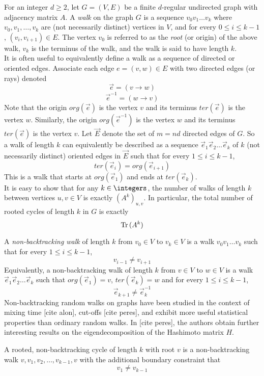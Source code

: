 \begin{description}
For an integer $d \geq 2$, let $G=(V,E)$ be a finite $d$-regular undirected graph with adjacency matrix $A$. A \emph{walk} on the graph $G$ is a sequence $v_0v_1\dots v_{k}$ where $v_0,v_1,\dots,v_k$ are (not necessarily distinct) vertices in $V$, and for every $0 \leq i \leq k-1$, $(v_i,v_{i+1}) \in E$. The vertex $v_0$ is referred to as the \emph{root} (or origin) of the above walk, $v_k$ is the terminus of the walk, and the walk is said to have length $k$.\\
It is often useful to equivalently define a walk as a sequence of directed or oriented edges. Associate each edge $e=(v,w) \in E$ with two directed edges (or rays) denoted
$$\vec{e}=(v \to w)$$
$$\vec{e}^{-1} = (w \to v)$$
Note that the origin $org(\vec{e})$ is the vertex $v$ and its terminus $ter(\vec{e})$ is the vertex $w$. Similarly, the origin $org(\vec{e}^{-1})$ is the vertex $w$ and its terminus $ter(\vec{e})$ is the vertex $v$. Let $\vec{E}$ denote the set of $m=nd$ directed edges of $G$. So a walk of length $k$ can equivalently be described as a sequence $\vec{e}_1\vec{e}_2\dots\vec{e}_k$ of $k$ (not necessarily distinct) oriented edges in $\vec{E}$ such that for every $1 \leq i \leq k-1$,
$$ter(\vec{e}_i) = org(\vec{e}_{i+1})$$
This is a walk that starts at $org(\vec{e}_1)$ and ends at $ter(\vec{e}_k)$.\\
It is easy to show that for any $k \in \integers$, the number of walks of length $k$ between vertices $u,v \in V$ is exactly $(A^k)_{u,v}$. In particular, the total number of rooted cycles of length $k$ in $G$ is exactly
$$\mbox{\rm Tr}\,(A^k)$$


A \emph{non-backtracking walk} of length $k$ from $v_0 \in V$ to $v_k \in
V$ is a walk $v_0v_1\dots v_k$ such that for every $1 \leq i \leq k-1$,
$$v_{i-1} \neq v_{i+1}$$
Equivalently, a non-backtracking walk of length $k$ from $v \in V$ to $w
\in V$ is a walk $\vec{e}_1\vec{e}_2\dots\vec{e}_k$ such that
$org(\vec{e}_1)=v$, $ter(\vec{e}_k)=w$ and for every $1 \leq i \leq k-1$,
$$\vec{e}_{k+1} \neq \vec{e}^{-1}_{k}$$
Non-backtracking random walks on graphs have been studied in the context
of mixing time [cite {alon}], cut-offs [cite {peres}], and exhibit more
useful statistical properties than ordinary random walks. In
[cite {peres}], the authors obtain further interesting results on the
eigendecomposition of the Hashimoto matrix $H$.

A rooted, non-backtracking cycle of length $k$ with root $v$ is a
non-backtracking walk $v,v_1,v_2,\dots,v_{k-1},v$ with the additional
boundary constraint that
$$v_1 \neq v_{k-1}$$


\end{description}
